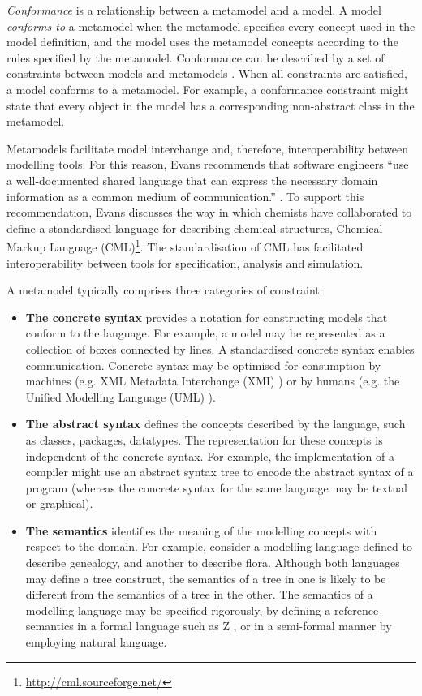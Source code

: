\emph{Conformance} is a relationship between a metamodel and a model. A model \emph{conforms to} a metamodel when the metamodel specifies every concept used in the model definition, and the model uses the metamodel concepts according to the rules specified by the metamodel. Conformance can be described by a set of constraints between models and metamodels \cite{paige07metamodel}. When all constraints are satisfied, a model conforms to a metamodel. For example, a conformance constraint might state that every object in the model has a corresponding non-abstract class in the metamodel.

Metamodels facilitate model interchange and, therefore, interoperability between modelling tools.  For this reason, Evans recommends that software engineers ``use a well-documented shared language that can express the necessary domain information as a common medium of communication.'' \cite[pg377]{evans04domain}. To support this recommendation, Evans discusses the way in which chemists have collaborated to define a standardised language for describing chemical structures, Chemical Markup Language (CML)\footnote{\url{http://cml.sourceforge.net/}}. The standardisation of CML has facilitated interoperability between tools for specification, analysis and simulation.

A metamodel typically comprises three categories of constraint:

\begin{itemize}
	\item \textbf{The concrete syntax} provides a notation for constructing models that conform to the language. For example, a model may be represented as a collection of boxes connected by lines. A standardised concrete syntax enables communication. Concrete syntax may be optimised for consumption by machines (e.g. XML Metadata Interchange (XMI) \cite{xmi}) or by humans (e.g. the Unified Modelling Language (UML) \cite{uml212}).
	\item \textbf{The abstract syntax} defines the concepts described by the language, such as classes, packages, datatypes. The representation for these concepts is independent of the concrete syntax. For example, the implementation of a compiler might use an abstract syntax tree to encode the abstract syntax of a program (whereas the concrete syntax for the same language may be textual or graphical).
	\item \textbf{The semantics} identifies the meaning of the modelling concepts with respect to the domain. For example, consider a modelling language defined to describe genealogy, and another to describe flora. Although both languages may define a tree construct, the semantics of a tree in one is likely to be different from the semantics of a tree in the other. The semantics of a modelling language may be specified rigorously, by defining a reference semantics in a formal language such as Z \cite{z}, or in a semi-formal manner by employing natural language.
\end{itemize}

